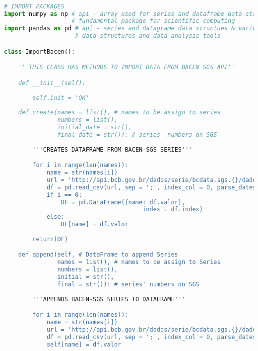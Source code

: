 \begin{lstlisting}[language=Python]

# IMPORT PACKAGES
import numpy as np # api - array used for series and dataframe data structures
                   # fundamental package for scientific computing
import pandas as pd # api - series and datagrame data structues & various 
                    # data structures and data analysis tools

class ImportBacen():

    '''THIS CLASS HAS METHODS TO IMPORT DATA FROM BACEN SGS API''

    def __init__(self):
        
        self.init = 'OK'
        
    def create(names = list(), # names to be assign to series
               numbers = list(),
               initial_date = str(),
               final_date = str()): # series' numbers on SGS
    
        '''CREATES DATAFRAME FROM BACEN-SGS SERIES'''

        for i in range(len(names)):
            name = str(names[i])
            url = 'http://api.bcb.gov.br/dados/serie/bcdata.sgs.{}/dados?formato=csv&&dataInicial={}&dataFinal={}'.format(numbers[i], initial_date, final_date)
            df = pd.read_csv(url, sep = ';', index_col = 0, parse_dates = [0], infer_datetime_format = True, decimal = ',')
            if i == 0:
                DF = pd.DataFrame({name: df.valor},
                                       index = df.index)
            else:
                DF[name] = df.valor
        
        return(DF)

    def append(self, # DataFrame to append Series
               names = list(), # names to be assign to Series
               numbers = list(),
               initial = str(),
               final = str()): # series' numbers on SGS
    
        '''APPENDS BACEN-SGS SERIES TO DATAFRAME'''

        for i in range(len(names)):
            name = str(names[i])
            url = 'http://api.bcb.gov.br/dados/serie/bcdata.sgs.{}/dados?formato=csv&&dataInicial={}&dataFinal={}'.format(numbers[i], initial_date, final_date)
            df = pd.read_csv(url, sep = ';', index_col = 0, parse_dates = [0], infer_datetime_format = True, decimal = ',')
            self[name] = df.valor

\end{lstlisting}